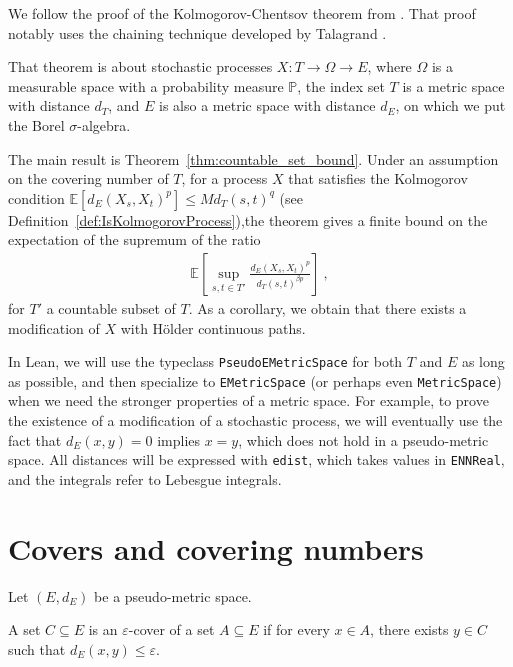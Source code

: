We follow the proof of the Kolmogorov-Chentsov theorem from \cite{kratschmer2023kolmogorov}.
That proof notably uses the chaining technique developed by Talagrand \cite{talagrand2022upper}.

That theorem is about stochastic processes $X : T \to \Omega \to E$, where $\Omega$ is a measurable space with a probability measure $\mathbb{P}$, the index set $T$ is a metric space with distance $d_T$, and $E$ is also a metric space with distance $d_E$, on which we put the Borel $\sigma$-algebra.

The main result is Theorem~\ref{thm:countable_set_bound}.
Under an assumption on the covering number of $T$, for a process $X$ that satisfies the Kolmogorov condition $\mathbb{E}[d_E(X_s, X_t)^p] \le M d_T(s, t)^q$ (see Definition~\ref{def:IsKolmogorovProcess}),the theorem gives a finite bound on the expectation of the supremum of the ratio
\begin{align*}
  \mathbb{E}\left[ \sup_{s, t \in T'} \frac{d_E(X_s, X_t)^p}{d_T(s, t)^{\beta p}} \right]
  \: ,
\end{align*}
for $T'$ a countable subset of $T$.
As a corollary, we obtain that there exists a modification of $X$ with Hölder continuous paths.

In Lean, we will use the typeclass \texttt{PseudoEMetricSpace} for both $T$ and $E$ as long as possible, and then specialize to \texttt{EMetricSpace} (or perhaps even \texttt{MetricSpace}) when we need the stronger properties of a metric space.
For example, to prove the existence of a modification of a stochastic process, we will eventually use the fact that $d_E(x, y) = 0$ implies $x = y$, which does not hold in a pseudo-metric space.
All distances will be expressed with \texttt{edist}, which takes values in \texttt{ENNReal}, and the integrals refer to Lebesgue integrals.

\section{Covers and covering numbers}

Let $(E, d_E)$ be a pseudo-metric space.

\begin{definition}\label{def:IsCover}
  \mathlibok
  A set $C \subseteq E$ is an $\varepsilon$-cover of a set $A \subseteq E$ if for every $x \in A$, there exists $y \in C$ such that $d_E(x, y) \le \varepsilon$.
\end{definition}


